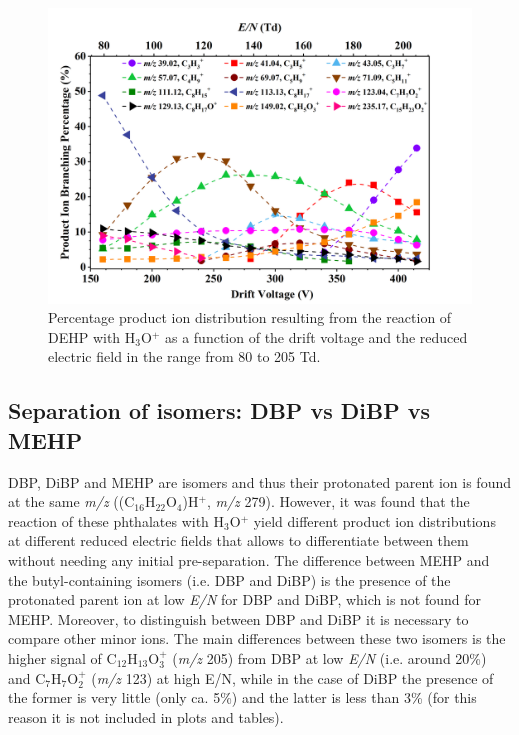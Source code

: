 \begin{figure}[htb]%
\centering
\includegraphics[height=0.35\textheight]{pics/DEHP-BR.png}
\caption{Percentage product ion distribution  resulting from the reaction of DEHP with H$_3$O$^+$ as a function of the drift voltage and the reduced electric field in the range from 80 to 205 Td.}
\label{fig:PH_DEHP_fs}
\end{figure}







\subsection{Separation of isomers: DBP vs DiBP vs MEHP }
DBP, DiBP and MEHP are isomers and thus their protonated parent ion is found at the same \textit{m/z} ((C$_{16}$H$_{22}$O$_4$)H$^+$, \textit{m/z} 279).
%
However, it was found that the reaction of these phthalates with H$_3$O$^+$ yield different product ion distributions at different reduced electric fields that allows to differentiate between them without needing any initial pre-separation.
%
The difference between MEHP and the butyl-containing isomers (i.e. DBP and DiBP)  is the presence of the protonated parent ion at low \textit{E/N} for DBP and DiBP, which is not found for MEHP.
Moreover, to distinguish between DBP and DiBP it is necessary to compare other minor ions.
%
The main differences between these two isomers is the higher signal of C$_{12}$H$_{13}$O$_3^+$ (\textit{m/z} 205) from DBP at low \textit{E/N} (i.e. around 20\%) and C$_{7}$H$_{7}$O$_2^+$ (\textit{m/z} 123) at high E/N, while in the case of DiBP the presence of the former is very little (only ca. 5\%) and the latter is less than 3\% (for this reason it is not included in plots and tables). 















